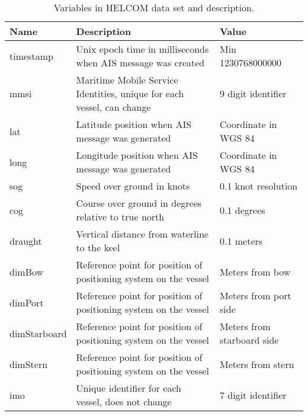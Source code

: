 \documentclass[../main.tex]{subfiles}
\begin{document}
\begin{table}[H]
\centering
\begin{tabular}{|l|m{7cm}|l|}
\hline
\rowcolor[HTML]{C0C0C0}
\textbf{Name} & \textbf{Description}                                                  & \textbf{Value}             \\ \hline
timestamp     & Unix epoch time in milliseconds when AIS message was created          & Min 1230768000000          \\ \hline
mmsi          & Maritime Mobile Service Identities, unique for each vessel, can change & 9 digit identifier         \\ \hline
lat           & Latitude position when AIS message was generated                      & Coordinate in WGS 84       \\ \hline
long          & Longitude position when AIS message was generated                     & Coordinate in WGS 84       \\ \hline
sog           & Speed over ground in knots                                            & 0.1 knot resolution        \\ \hline
cog           & Course over ground in degrees relative to true north                  & 0.1 degrees                \\ \hline
draught       & Vertical distance from waterline to the keel                          & 0.1 meters                 \\ \hline
dimBow        & Reference point for position of positioning system on the vessel      & Meters from bow            \\ \hline
dimPort       & Reference point for position of positioning system on the vessel      & Meters from port side      \\ \hline
dimStarboard  & Reference point for position of positioning system on the vessel      & Meters from starboard side \\ \hline
dimStern      & Reference point for position of positioning system on the vessel      & Meters from stern          \\ \hline
imo           & Unique identifier for each vessel, does not change                    & 7 digit identifier         \\ \hline
\end{tabular}
\caption{Variables in HELCOM data set and description.}
\label{tabl:HELCOM-features}
\end{table}
\end{document}
